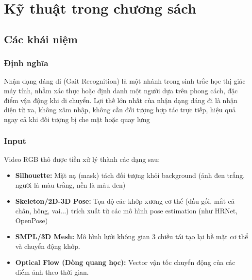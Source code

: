 \section{Kỹ thuật trong chương sách}

\subsection{Các khái niệm}
\subsubsection{Định nghĩa} 
Nhận dạng dáng đi (Gait Recognition) là một nhánh trong sinh trắc học thị giác máy tính, nhằm xác thực hoặc định danh một người dựa trên phong cách, đặc điểm vận động khi di chuyển. Lợi thế lớn nhất của nhận dạng dáng đi là nhận diện từ xa, không xâm nhập, không cần đối tượng hợp tác trực tiếp, hiệu quả ngay cả khi đối tượng bị che mặt hoặc quay lưng

\subsubsection{Input} 
Video RGB thô được tiền xử lý thành các dạng sau:
\begin{itemize}
    \item \textbf{Silhouette:} Mặt nạ (mask) tách đối tượng khỏi background (ảnh đen trắng, người là màu trắng, nền là màu đen)
    \item \textbf{Skeleton/2D-3D Pose:} Tọa độ các khớp xương cơ thể (đầu gối, mắt cá chân, hông, vai...) trích xuất từ các mô hình pose estimation (như HRNet, OpenPose)
    \item \textbf{SMPL/3D Mesh:} Mô hình lưới không gian 3 chiều tái tạo lại bề mặt cơ thể và chuyển động khớp.
    \item \textbf{Optical Flow (Dòng quang học):} Vector vận tốc chuyển động của các điểm ảnh theo thời gian.
\end{itemize}
    
